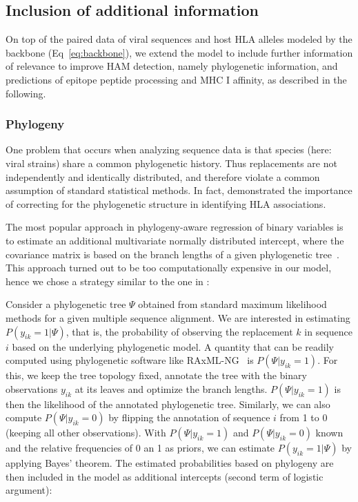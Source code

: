 \documentclass{bioinfo}
\begin{document}
\begin{methods}

\subsection{Inclusion of additional information}

On top of the paired data of viral sequences and host HLA alleles modeled by the backbone (Eq~\ref{eq:backbone}), we extend the model to include further information of relevance to improve HAM detection, namely phylogenetic information, and predictions of epitope peptide processing and MHC I affinity, as described in the following.

\subsubsection{Phylogeny}
One problem that occurs when analyzing sequence data is that species (here: viral strains) share a common phylogenetic history. Thus replacements are not independently and identically distributed, and therefore violate a common assumption of standard statistical methods. In fact, \citet{Bhattacharya2007} demonstrated the importance of correcting for the phylogenetic structure in identifying HLA associations.

The most popular approach in phylogeny-aware regression of binary variables is to estimate an additional multivariate normally distributed intercept, where the covariance matrix is based on the branch lengths of a given phylogenetic tree~\citep{Ives2009, Ives2014}.
This approach turned out to be too computationally expensive in our model, hence we chose a strategy similar to the one in \citet{Carlson2008}:

Consider a phylogenetic tree \(\Psi\) obtained from standard maximum likelihood methods for a given multiple sequence alignment. We are interested in estimating \(P(y_{ik}=1|\Psi)\), that is, the probability of observing the replacement \(k\) in sequence \(i\) based on the underlying phylogenetic model. A quantity that can be readily computed using phylogenetic software like RAxML-NG~\cite{Kozlov2019} is \(P(\Psi|y_{ik}=1)\). For this, we keep the tree topology fixed, annotate the tree with the binary observations \(y_{ik}\) at its leaves and optimize the branch lengths. \(P(\Psi|y_{ik}=1)\) is then the likelihood of the annotated phylogenetic tree. Similarly, we can also compute \(P(\Psi|y_{ik}=0)\) by flipping the annotation of sequence $i$ from 1 to 0 (keeping all other observations). With  $P(\Psi|y_{ik}=1)$ and $P(\Psi|y_{ik}=0)$ known and the relative frequencies of 0 an 1 as priors, we can estimate $P(y_{ik}=1|\Psi)$ by applying Bayes' theorem. The estimated probabilities based on phylogeny are then included in the model as additional intercepts (second term of logistic argument):


\end{methods}
\end{document}
